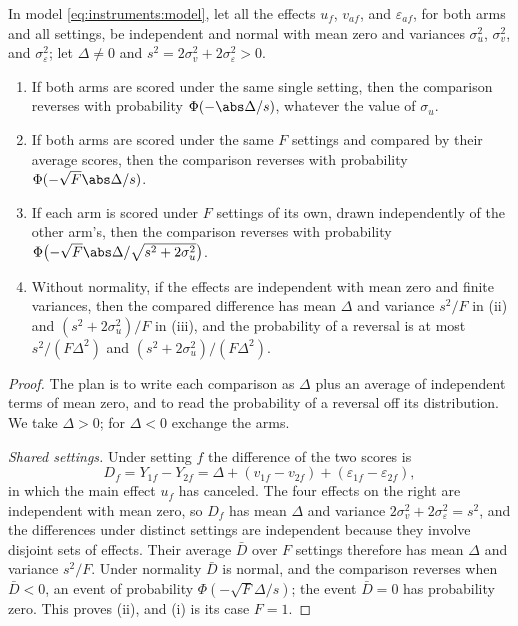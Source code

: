 \begin{refsection}
\begin{theorem}\label{thm:instruments:ranking}
In model \eqref{eq:instruments:model}, let all the effects $u_f$, $v_{af}$, and $\varepsilon_{af}$, for both arms and all settings, be independent and normal with mean zero and variances $\sigma_u^2$, $\sigma_v^2$, and $\sigma_\varepsilon^2$; let $\Delta\ne0$ and $s^2=2\sigma_v^2+2\sigma_\varepsilon^2>0$.
\begin{enumerate}
\item If both arms are scored under the same single setting, then the comparison reverses with probability $\Phi(-\abs\Delta/s)$, whatever the value of $\sigma_u$.
\item If both arms are scored under the same $F$ settings and compared by their average scores, then the comparison reverses with probability $\Phi(-\sqrt F\abs\Delta/s)$.
\item If each arm is scored under $F$ settings of its own, drawn independently of the other arm's, then the comparison reverses with probability $\Phi\bigl(-\sqrt F\abs\Delta/\sqrt{s^2+2\sigma_u^2}\bigr)$.
\item Without normality, if the effects are independent with mean zero and finite variances, then the compared difference has mean $\Delta$ and variance $s^2/F$ in (ii) and $(s^2+2\sigma_u^2)/F$ in (iii), and the probability of a reversal is at most $s^2/(F\Delta^2)$ and $(s^2+2\sigma_u^2)/(F\Delta^2)$.
\end{enumerate}
\end{theorem}

\begin{proof}
The plan is to write each comparison as $\Delta$ plus an average of independent terms of mean zero, and to read the probability of a reversal off its distribution. We take $\Delta>0$; for $\Delta<0$ exchange the arms.

\emph{Shared settings.} Under setting $f$ the difference of the two scores is
\[
D_f=Y_{1f}-Y_{2f}=\Delta+(v_{1f}-v_{2f})+(\varepsilon_{1f}-\varepsilon_{2f}),
\]
in which the main effect $u_f$ has canceled. The four effects on the right are independent with mean zero, so $D_f$ has mean $\Delta$ and variance $2\sigma_v^2+2\sigma_\varepsilon^2=s^2$, and the differences under distinct settings are independent because they involve disjoint sets of effects. Their average $\bar D$ over $F$ settings therefore has mean $\Delta$ and variance $s^2/F$. Under normality $\bar D$ is normal, and the comparison reverses when $\bar D<0$, an event of probability $\Phi(-\sqrt F\Delta/s)$; the event $\bar D=0$ has probability zero. This proves (ii), and (i) is its case $F=1$.


\end{proof}
\end{refsection}
